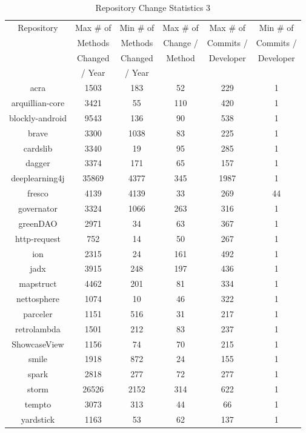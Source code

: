 \begin{table}
\begin{center}
    \begin{tabular}{|c|c|c|c|c|c|}
        \hline
        Repository & Max \# of & Min \# of & Max \# of & Max \# of & Min \# of \\
         & Methods & Methods & Change / & Commits / & Commits / \\
         & Changed & Changed & Method & Developer & Developer \\
         & / Year & / Year & & & \\
        \hline
        acra & 1503 & 183 & 52 & 229 & 1 \\
        arquillian-core & 3421 & 55 & 110 & 420 & 1 \\
        blockly-android & 9543 & 136 & 90 & 538 & 1 \\
        brave & 3300 & 1038 & 83 & 225 & 1 \\
        cardslib & 3340 & 19 & 95 & 285 & 1 \\
        dagger & 3374 & 171 & 65 & 157 & 1 \\
        deeplearning4j & 35869 & 4377 & 345 & 1987 & 1 \\
        fresco & 4139 & 4139 & 33 & 269 & 44 \\
        governator & 3324 & 1066 & 263 & 316 & 1 \\
        greenDAO & 2971 & 34 & 63 & 367 & 1 \\
        http-request & 752 & 14 & 50 & 267 & 1 \\
        ion & 2315 & 24 & 161 & 492 & 1 \\
        jadx & 3915 & 248 & 197 & 436 & 1 \\
        mapstruct & 4462 & 201 & 81 & 334 & 1 \\
        nettosphere & 1074 & 10 & 46 & 322 & 1 \\
        parceler & 1151 & 516 & 31 & 217 & 1 \\
        retrolambda & 1501 & 212 & 83 & 237 & 1 \\
        ShowcaseView & 1156 & 74 & 70 & 215 & 1 \\
        smile & 1918 & 872 & 24 & 155 & 1 \\
        spark & 2818 & 277 & 72 & 277 & 1 \\
        storm & 26526 & 2152 & 314 & 622 & 1 \\
        tempto & 3073 & 313 & 44 & 66 & 1 \\
        yardstick & 1163 & 53 & 62 & 137 & 1 \\
        \hline
    \end{tabular}
\end{center}
\caption{Repository Change Statistics 3}
\label{tab:repository_stats_3}
\end{table}

